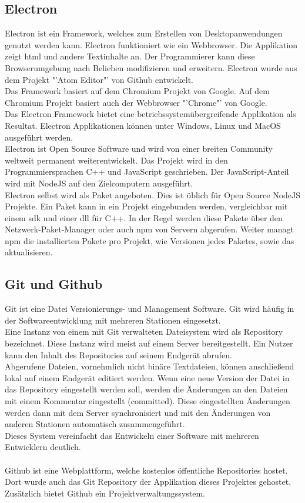 \documentclass[11pt]{scrartcl}
\begin{document}
\subsection{Electron}
Electron ist ein Framework, welches zum Erstellen von Desktopanwendungen genutzt werden kann. Electron funktioniert
wie ein Webbrowser. Die Applikation zeigt \ac{html} und andere Textinhalte an.\cite{electron} Der Programmierer kann diese
Browserumgebung nach Belieben modifizieren und erweitern. Electron wurde aus dem Projekt "'Atom Editor"' von Github entwickelt.\\
Das Framework basiert auf dem Chromium Projekt von Google. Auf dem Chromium Projekt basiert auch der Webbrowser "'Chrome"' von
Google.\\
Das Electron Framework bietet eine betriebssystemübergreifende Applikation als Resultat. Electron Applikationen können unter
Windows, Linux und MacOS ausgeführt werden.\\
Electron ist Open Source Software und wird von einer breiten Community weltweit permanent weiterentwickelt.\cite{electron} Das Projekt wird
in den Programmiersprachen C++ und JavaScript geschrieben. Der JavaScript-Anteil wird mit NodeJS auf den Zielcomputern ausgeführt.\\
Electron selbst wird als Paket angeboten. Dies ist üblich für Open Source NodeJS Projekte. Ein Paket kann in ein Projekt eingebunden werden,
vergleichbar mit einem \ac{sdk} und einer \ac{dll} für C++. In der Regel werden diese Pakete über den Netzwerk-Paket-Manager oder auch
\ac{npm} von Servern abgerufen. Weiter managt \ac{npm} die installierten Pakete pro Projekt, wie Versionen jedes Paketes, sowie das
aktualisieren.

\subsection{Git und Github}
Git ist eine Datei Versionierungs- und Management Software. Git wird häufig in der Softwareentwicklung mit mehreren Stationen eingesetzt.\\
Eine Instanz von einem mit Git verwalteten Dateisystem wird als Repository bezeichnet. Diese Instanz wird meist auf einem Server
bereitgestellt. Ein Nutzer kann den Inhalt des Repositories auf seinem Endgerät abrufen.\\
Abgerufene Dateien, vornehmlich nicht binäre Textdateien, können anschließend lokal auf einem Endgerät editiert werden. Wenn eine neue
Version der Datei in das Repository eingestellt werden soll, werden die Änderungen an den Dateien mit einem Kommentar eingestellt
(committed). Diese eingestellten Änderungen werden dann mit dem Server synchronisiert und mit den Änderungen von anderen Stationen
automatisch zusammengeführt.\\
Dieses System vereinfacht das Entwickeln einer Software mit mehreren Entwicklern deutlich.\\
\\
Github ist eine Webplattform, welche kostenlos öffentliche Repositories hostet. Dort wurde auch das Git Repository der Applikation
dieses Projektes gehostet.\\
Zusätzlich bietet Github ein Projektverwaltungssystem.
\clearpage
\end{document}
